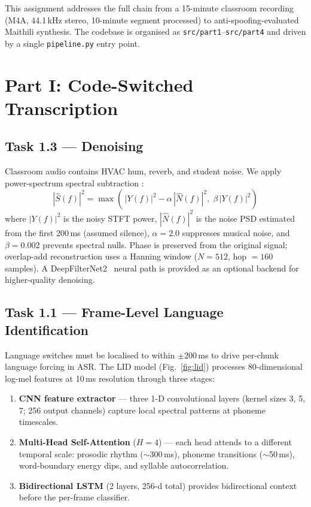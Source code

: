 \documentclass[conference]{IEEEtran}
\begin{document}
This assignment addresses the full chain from a 15-minute classroom
recording (M4A, 44.1\,kHz stereo, 10-minute segment processed) to
anti-spoofing-evaluated Maithili synthesis.
The codebase is organised as \texttt{src/part1}--\texttt{src/part4}
and driven by a single \texttt{pipeline.py} entry point.

\section{Part I: Code-Switched Transcription}

\subsection{Task 1.3 --- Denoising}

Classroom audio contains HVAC hum, reverb, and student noise.
We apply power-spectrum spectral subtraction \cite{boll1979}:
\begin{equation}
  |\hat{S}(f)|^{2} =
  \max\!\left(\,|Y(f)|^{2} - \alpha\,|\hat{N}(f)|^{2},\;
               \beta\,|Y(f)|^{2}\right)
\label{eq:ss}
\end{equation}
where $|Y(f)|^{2}$ is the noisy STFT power, $|\hat{N}(f)|^{2}$ is the
noise PSD estimated from the first 200\,ms (assumed silence),
$\alpha=2.0$ suppresses musical noise, and $\beta=0.002$ prevents
spectral nulls.
Phase is preserved from the original signal; overlap-add reconstruction
uses a Hanning window ($N{=}512$, hop $= 160$ samples).
A DeepFilterNet2~\cite{schroter2022} neural path is provided as an
optional backend for higher-quality denoising.

\subsection{Task 1.1 --- Frame-Level Language Identification}

Language switches must be localised to within $\pm 200$\,ms to drive
per-chunk language forcing in ASR.
The LID model (Fig.~\ref{fig:lid}) processes 80-dimensional log-mel
features at 10\,ms resolution through three stages:

\begin{enumerate}
  \item \textbf{CNN feature extractor} --- three 1-D convolutional
        layers (kernel sizes 3, 5, 7; 256 output channels) capture
        local spectral patterns at phoneme timescales.
  \item \textbf{Multi-Head Self-Attention} ($H{=}4$) --- each head
        attends to a different temporal scale: prosodic rhythm
        ($\sim$300\,ms), phoneme transitions ($\sim$50\,ms),
        word-boundary energy dips, and syllable autocorrelation.
  \item \textbf{Bidirectional LSTM} (2 layers, 256-d total) provides
        bidirectional context before the per-frame classifier.
\end{enumerate}
\end{document}
